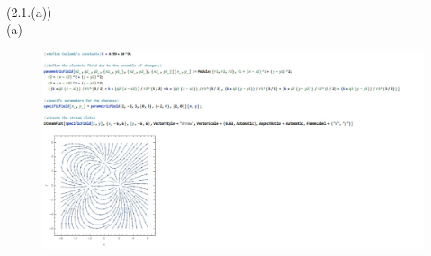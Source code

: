 \documentclass[journal,12pt,onecolumn]{IEEEtran}
\theoremstyle{remark}
\begin{document}
\solution \\
(2.1.(a))\\
(a)
\begin{figure}[H]
    \centering
     \includegraphics[scale=0.40]{figs/e1.jpeg}
    \caption{}    
    \label{fig:ishitha.em.fig1}
\end{figure}
\end{document}
